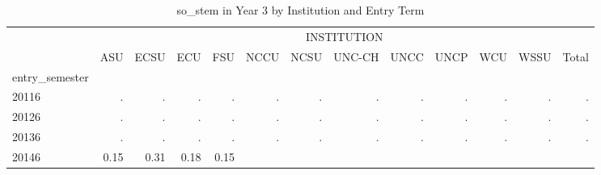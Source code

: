 \begin{table}[!h]
\caption{so\_stem in Year 3 by Institution and Entry Term}
\centering
\begin{tabular}{lllllllllllll}
\cline{1-13}
\multicolumn{1}{c}{} &
  \multicolumn{12}{|c}{INSTITUTION} \\
\multicolumn{1}{c}{} &
  \multicolumn{1}{|r}{ASU} &
  \multicolumn{1}{r}{ECSU} &
  \multicolumn{1}{r}{ECU} &
  \multicolumn{1}{r}{FSU} &
  \multicolumn{1}{r}{NCCU} &
  \multicolumn{1}{r}{NCSU} &
  \multicolumn{1}{r}{UNC-CH} &
  \multicolumn{1}{r}{UNCC} &
  \multicolumn{1}{r}{UNCP} &
  \multicolumn{1}{r}{WCU} &
  \multicolumn{1}{r}{WSSU} &
  \multicolumn{1}{r}{Total} \\
\cline{1-13}
\multicolumn{1}{l}{entry\_semester} &
  \multicolumn{1}{|r}{} &
  \multicolumn{1}{r}{} &
  \multicolumn{1}{r}{} &
  \multicolumn{1}{r}{} &
  \multicolumn{1}{r}{} &
  \multicolumn{1}{r}{} &
  \multicolumn{1}{r}{} &
  \multicolumn{1}{r}{} &
  \multicolumn{1}{r}{} &
  \multicolumn{1}{r}{} &
  \multicolumn{1}{r}{} &
  \multicolumn{1}{r}{} \\
\multicolumn{1}{l}{\hspace{1em}20116} &
  \multicolumn{1}{|r}{.} &
  \multicolumn{1}{r}{.} &
  \multicolumn{1}{r}{.} &
  \multicolumn{1}{r}{.} &
  \multicolumn{1}{r}{.} &
  \multicolumn{1}{r}{.} &
  \multicolumn{1}{r}{.} &
  \multicolumn{1}{r}{.} &
  \multicolumn{1}{r}{.} &
  \multicolumn{1}{r}{.} &
  \multicolumn{1}{r}{.} &
  \multicolumn{1}{r}{.} \\
\multicolumn{1}{l}{\hspace{1em}20126} &
  \multicolumn{1}{|r}{.} &
  \multicolumn{1}{r}{.} &
  \multicolumn{1}{r}{.} &
  \multicolumn{1}{r}{.} &
  \multicolumn{1}{r}{.} &
  \multicolumn{1}{r}{.} &
  \multicolumn{1}{r}{.} &
  \multicolumn{1}{r}{.} &
  \multicolumn{1}{r}{.} &
  \multicolumn{1}{r}{.} &
  \multicolumn{1}{r}{.} &
  \multicolumn{1}{r}{.} \\
\multicolumn{1}{l}{\hspace{1em}20136} &
  \multicolumn{1}{|r}{.} &
  \multicolumn{1}{r}{.} &
  \multicolumn{1}{r}{.} &
  \multicolumn{1}{r}{.} &
  \multicolumn{1}{r}{.} &
  \multicolumn{1}{r}{.} &
  \multicolumn{1}{r}{.} &
  \multicolumn{1}{r}{.} &
  \multicolumn{1}{r}{.} &
  \multicolumn{1}{r}{.} &
  \multicolumn{1}{r}{.} &
  \multicolumn{1}{r}{.} \\
\multicolumn{1}{l}{\hspace{1em}20146} &
  \multicolumn{1}{|r}{0.15} &
  \multicolumn{1}{r}{0.31} &
  \multicolumn{1}{r}{0.18} &
  \multicolumn{1}{r}{0.15} &

\end{tabular}
\end{table}

